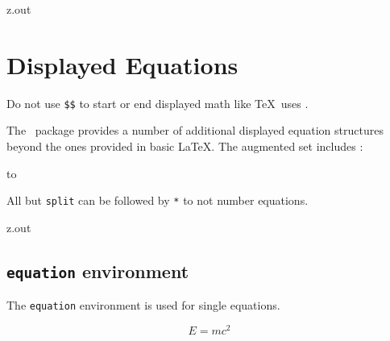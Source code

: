 \begin{VerbatimOut}{z.out}
\section{Displayed Equations}

Do not use \verb+$$+ to start or end displayed math like \TeX\ uses
\cite{gratzer2016}.

The \AMSmathLogo\ package provides a number
of additional displayed equation structures
beyond the ones provided in basic \LaTeX.
The augmented set includes
\cite{amslatex3project2019b}:

\hbox to

All but \verb+split+ can be followed by \verb+*+ to not number equations.
\end{VerbatimOut}

\MyIO


\begin{VerbatimOut}{z.out}

\subsection{\texttt{equation} environment}

The \verb+equation+ environment is used for single equations.

\begin{equation}
  E = mc^2
\end{equation}
\end{VerbatimOut}

\MyIO


